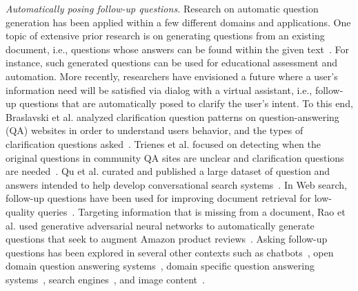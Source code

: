 \noindent
{\em Automatically posing follow-up questions.} Research on automatic question generation has been applied within a few different domains and applications. One topic of extensive prior research is on generating questions from an existing document, i.e., questions whose answers can be found within the given text~\cite{vanderwende2008importance,rus2011question,zhou2017neural,heilman2010good,duan2017question,du2017learning}. For instance, such generated questions can be used for educational assessment and automation. More recently, researchers have envisioned a future where a user's information need will be satisfied via dialog with a virtual assistant, i.e., follow-up questions that are automatically posed to clarify the user's intent. To this end, Braslavski et al. analyzed clarification question patterns on question-answering (QA) websites in order to understand users behavior, and the types of clarification questions asked~\cite{10.1145/3020165.3022149}. Trienes et al. focused on detecting when the original questions in community QA sites are unclear and clarification questions are needed~\cite{trienes2019identifying}. Qu et al. curated and published a large dataset of question and answers intended to help develop conversational search systems~\cite{10.1145/3209978.3210124}. In Web search, follow-up questions have been used for improving document retrieval for low-quality queries~\cite{10.1145/3366423.3380126,10.1145/3331184.3331265,stoyanchev2014towards}. Targeting information that is missing from a document, Rao et al. used generative adversarial neural networks to automatically generate questions that seek to augment Amazon product reviews~\cite{rao2019answer}. Asking follow-up questions has been explored in several other contexts such as chatbots~\cite{Hancock2019LearningFD}, open domain question answering systems~\cite{de2005implementing, de2003analysis}, domain specific question answering systems~\cite{zhang2020chatbot4qr}, search engines~\cite{Ren2020ConversationsWS}, and image content~\cite{Mostafazadeh_2016}.
